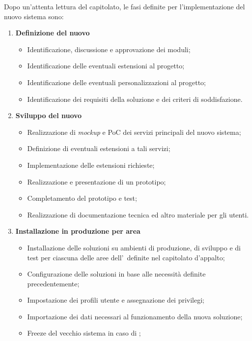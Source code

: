 	Dopo un'attenta lettura del capitolato, le fasi definite per l'implementazione del nuovo sistema sono:
	\begin{enumerate}
		\item \textbf{Definizione del nuovo \helpdesk}
			\begin{itemize}[noitemsep]
				\renewcommand\labelitemi{--}
				\item Identificazione, discussione e approvazione dei moduli;
				\item Identificazione delle eventuali estensioni al progetto;
				\item Identificazione delle eventuali personalizzazioni al progetto;
				\item Identificazione dei requisiti della soluzione e dei criteri di soddisfazione.
			\end{itemize}
			
		\item \textbf{Sviluppo del nuovo \helpdesk}
			\begin{itemize}[noitemsep]
				\renewcommand\labelitemi{--}
				\item Realizzazione di \textit{mockup} e PoC dei servizi principali del nuovo sistema;
				\item Definizione di eventuali estensioni a tali servizi;
				\item Implementazione delle estensioni richieste;
				\item Realizzazione e presentazione di un prototipo;
				\item Completamento del prototipo e test;
				\item Realizzazione di documentazione tecnica ed altro materiale per gli utenti.
			\end{itemize}
			
		\newpage
		\item \textbf{Installazione in produzione per area}
			\begin{itemize}[noitemsep]
				\renewcommand\labelitemi{--}
				\item Installazione delle soluzioni su ambienti di produzione, di sviluppo e di test per ciascuna delle aree dell'\istituto~definite nel capitolato d'appalto;
				\item Configurazione delle soluzioni in base alle necessità definite precedentemente;
				\item Impostazione dei profili utente e assegnazione dei privilegi;
				\item Importazione dei dati necessari al funzionamento della nuova soluzione;
				\item Freeze del vecchio sistema in caso di \rollback;
			\end{itemize}
				

\end{enumerate}
